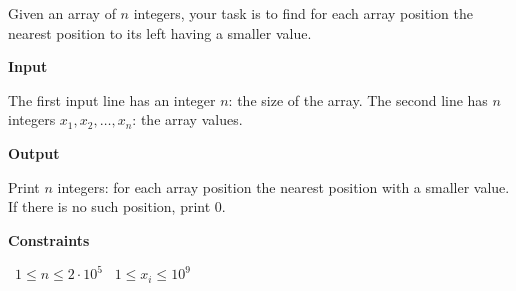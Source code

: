 Given an array of $n$ integers, your task is to find for each array position the nearest position to its left having a smaller value.

\vspace{0.3cm}\noindent\textbf{Input}

The first input line has an integer $n$: the size of the array.
The second line has $n$ integers $x_1,x_2,\dots,x_n$: the array values.

\vspace{0.3cm}\noindent\textbf{Output}

Print $n$ integers: for each array position the nearest position with a smaller value. If there is no such position, print $0$.

\vspace{0.3cm}\noindent\textbf{Constraints}

\textbullet\ $1 \le n \le 2 \cdot 10^5$
\textbullet\ $1 \le x_i \le 10^9$